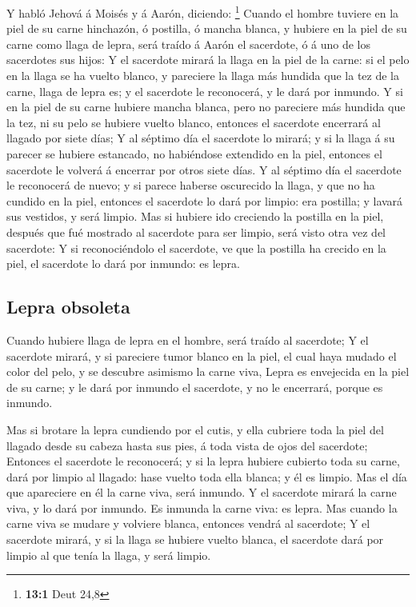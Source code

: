  Y habló Jehová á Moisés y á Aarón, diciendo: \footnote{\textbf{13:1}
  Deut 24,8}  Cuando el hombre tuviere en la piel de su
carne hinchazón, ó postilla, ó mancha blanca, y hubiere en la piel de su
carne como llaga de lepra, será traído á Aarón el sacerdote, ó á uno de
los sacerdotes sus hijos:  Y el sacerdote mirará la llaga en
la piel de la carne: si el pelo en la llaga se ha vuelto blanco, y
pareciere la llaga más hundida que la tez de la carne, llaga de lepra
es; y el sacerdote le reconocerá, y le dará por inmundo.  Y
si en la piel de su carne hubiere mancha blanca, pero no pareciere más
hundida que la tez, ni su pelo se hubiere vuelto blanco, entonces el
sacerdote encerrará al llagado por siete días;  Y al séptimo
día el sacerdote lo mirará; y si la llaga á su parecer se hubiere
estancado, no habiéndose extendido en la piel, entonces el sacerdote le
volverá á encerrar por otros siete días.  Y al séptimo día
el sacerdote le reconocerá de nuevo; y si parece haberse oscurecido la
llaga, y que no ha cundido en la piel, entonces el sacerdote lo dará por
limpio: era postilla; y lavará sus vestidos, y será limpio. 
Mas si hubiere ido creciendo la postilla en la piel, después que fué
mostrado al sacerdote para ser limpio, será visto otra vez del
sacerdote:  Y si reconociéndolo el sacerdote, ve que la
postilla ha crecido en la piel, el sacerdote lo dará por inmundo: es
lepra.

\hypertarget{lepra-obsoleta}{%
\subsection{Lepra obsoleta}\label{lepra-obsoleta}}

 Cuando hubiere llaga de lepra en el hombre, será traído al
sacerdote;  Y el sacerdote mirará, y si pareciere tumor
blanco en la piel, el cual haya mudado el color del pelo, y se descubre
asimismo la carne viva,  Lepra es envejecida en la piel de
su carne; y le dará por inmundo el sacerdote, y no le encerrará, porque
es inmundo.

 Mas si brotare la lepra cundiendo por el cutis, y ella
cubriere toda la piel del llagado desde su cabeza hasta sus pies, á toda
vista de ojos del sacerdote;  Entonces el sacerdote le
reconocerá; y si la lepra hubiere cubierto toda su carne, dará por
limpio al llagado: hase vuelto toda ella blanca; y él es limpio.
 Mas el día que apareciere en él la carne viva, será
inmundo.  Y el sacerdote mirará la carne viva, y lo dará
por inmundo. Es inmunda la carne viva: es lepra.  Mas
cuando la carne viva se mudare y volviere blanca, entonces vendrá al
sacerdote;  Y el sacerdote mirará, y si la llaga se hubiere
vuelto blanca, el sacerdote dará por limpio al que tenía la llaga, y
será limpio.


